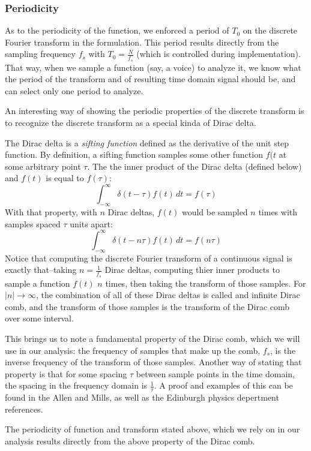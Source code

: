 \documentclass[12pt]{article}
\newcommand{\inftyint}{\int_{-\infty}^{\infty}}
\begin{document}
\subsubsection*{Periodicity}
As to the periodicity of the function, we enforced a period of \(T_0\) on the
discrete Fourier transform in the formulation. This period results directly
from the sampling frequency \(f_s\) with \(T_0 = \frac{N}{f_s}\) (which is
controlled during implementation). That way, when we sample a function (say, a
voice) to analyze it, we know what the period of the transform and of resulting
time domain signal should be, and can select only one period to analyze.

An interesting way of showing the periodic properties of the discrete transform
is to recognize the discrete transform as a special kinda of Dirac delta. 

The Dirac delta is a \emph{sifting function} defined as the derivative of the 
unit step function. By definition, a sifting function samples some other 
function \( f(t \) at some arbitrary point \( \tau \). The the inner product 
of the Dirac delta (defined below) and \( f(t)\) is equal to \( f(\tau) \):
\[ \inftyint \delta(t - \tau)f(t) \, dt = f(\tau) \]
With that property, with \(n\) Dirac deltas, \( f (t) \) would be sampled
\( n\) times with samples spaced \( \tau\) units apart:
\[ \inftyint \delta(t - n\tau)f(t) \, dt = f(n\tau) \]
Notice that computing the discrete Fourier transform of a continuous 
signal is exactly that--taking \( n = \frac{1}{f_s} \) Dirac deltas, computing 
thier inner products to sample a function \( f(t) \) \(n\) times, then
taking the transform of those samples. For \( |n| \to \infty \), the 
combination of all of these Dirac deltas is called and infinite Dirac comb, 
and the transform of those samples is the transform of the Dirac comb over some
interval. 

This brings us to note a fundamental property of the Dirac comb, which we will
use in our analysis: the frequency of samples that make up the comb, 
\( f_s \), is the inverse frequency of the transform of those samples.
Another way of stating that property is that for some spacing \( \tau\) 
between sample points in the time domain, the spacing in the frequency 
domain is \( \frac{1}{\tau} \). A proof and examples of this can be found in 
the Allen and Mills, as well as the Edinburgh physics depertment references.

The periodicity of function and transform stated above, which we rely on in 
our analysis results directly from the above property of the Dirac comb.
\end{document}
